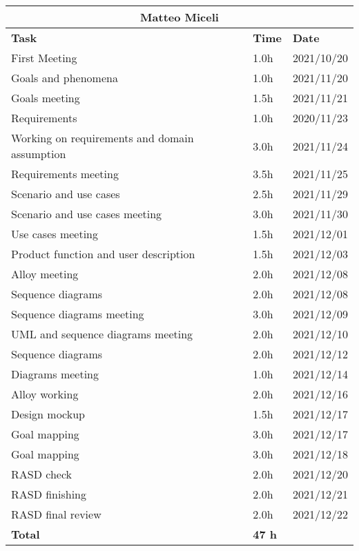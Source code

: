 \begin{table}[!ht]
\centering
\begin{tabular}{|p{}|p{}|p{}|}
\hline
\multicolumn{3}{|c|}{\textbf{Matteo Miceli}}            \\ \hline
\textbf{Task}                   & \textbf{Time} & \textbf{Date} \\ \hline

First Meeting				&		1.0h	   &	2021/10/20 \\ \hline
Goals and phenomena			&		1.0h	   & 	2021/11/20 \\ \hline
Goals meeting					&		1.5h	   &	2021/11/21 \\ \hline
Requirements		&		1.0h	   &	2020/11/23 \\ \hline
Working on requirements and domain assumption			&		3.0h	   &	2021/11/24 \\ \hline
Requirements  meeting		&		3.5h	   &	2021/11/25 \\ \hline
Scenario and use cases		&		2.5h    &   	2021/11/29 \\ \hline
Scenario and use cases meeting		&		3.0h	   & 	2021/11/30 \\ \hline
Use cases meeting		&		1.5h	   & 	2021/12/01 \\ \hline
Product function and user description		&		1.5h	   & 	2021/12/03 \\ \hline
Alloy meeting				&		2.0h     &	2021/12/08 \\ \hline
Sequence diagrams			&	 2.0h	  &	2021/12/08 \\ \hline
Sequence diagrams meeting				&		3.0h	   & 	2021/12/09 \\ \hline
UML and sequence diagrams meeting				&		2.0h	   & 	2021/12/10 \\ \hline
Sequence diagrams			&		2.0h	  &	2021/12/12 \\ \hline
Diagrams meeting				&		1.0h	   & 	2021/12/14 \\ \hline
Alloy working				&		2.0h	  &    2021/12/16 \\ \hline 
Design mockup			&		1.5h	  &    2021/12/17 \\ \hline 
Goal mapping	&		3.0h	  &    2021/12/17  \\ \hline
Goal mapping	&		3.0h	  &    2021/12/18  \\ \hline
RASD check				&		2.0h   &	2021/12/20 \\ \hline
RASD finishing				&		2.0h	  &    2021/12/21  \\ \hline
RASD final review			&		2.0h	  &    2021/12/22  \\ \hline
\textbf{Total}                  		&  \textbf{47 h}   & \\ \hline
\end{tabular}
\end{table}


